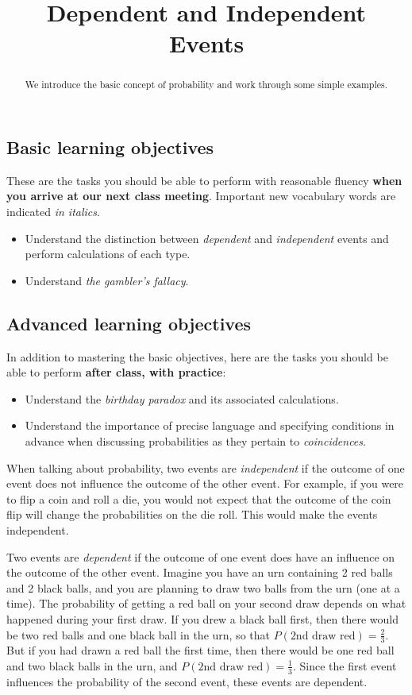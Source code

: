 \documentclass{ximera}
\title{Dependent and Independent Events}
\begin{document}
\begin{abstract}
We introduce the basic concept of probability and work through some simple examples.
\end{abstract}
\maketitle

\subsection*{Basic learning objectives}

These are the tasks you should be able to perform with reasonable fluency \textbf{when you arrive at our next class meeting}. Important new vocabulary words are indicated \emph{in italics}. 

\begin{itemize}
	\item Understand the distinction between \emph{dependent} and \emph{independent} events and perform calculations of each type.
    \item Understand \emph{the gambler's fallacy}.
\end{itemize}

\subsection*{Advanced learning objectives}

In addition to mastering the basic objectives, here are the tasks you should be able to perform \textbf{after class, with practice}: 

\begin{itemize}
	\item Understand the \emph{birthday paradox} and its associated calculations.
    \item Understand the importance of precise language and specifying conditions in advance when discussing probabilities as they pertain to \emph{coincidences}.
\end{itemize}

When talking about probability, two events are \emph{independent} if the outcome of one event does not influence the outcome of the other event. For example, if you were to flip a coin and roll a die, you would not expect that the outcome of the coin flip will change the probabilities on the die roll. This would make the events independent.

Two events are \emph{dependent} if the outcome of one event does have an influence on the outcome of the other event. Imagine you have an urn containing 2 red balls and 2 black balls, and you are planning to draw two balls from the urn (one at a time). The probability of getting a red ball on your second draw depends on what happened during your first draw. If you drew a black ball first, then there would be two red balls and one black ball in the urn, so that $P(\text{2nd draw red}) = \frac{2}{3}$. But if you had drawn a red ball the first time, then there would be one red ball and two black balls in the urn, and $P(\text{2nd draw red}) = \frac{1}{3}$. Since the first event influences the probability of the second event, these events are dependent.
\end{document}
